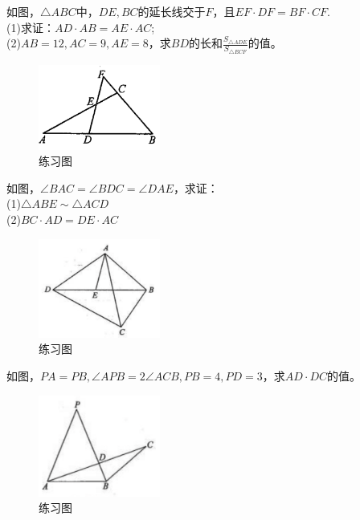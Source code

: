 \documentclass{ecnuthesis}
\begin{document}
\begin{problem}
    如图，$\triangle ABC$中，$DE,BC$的延长线交于$F$，且$EF·DF=BF·CF$. \\
    (1)求证：$AD·AB=AE·AC$; \\
    (2)$AB=12,AC=9,AE=8$，求$BD$的长和$\frac{S_{\triangle ADE}}{S_{\triangle ECF}}$的值。\\
\end{problem}
\begin{figure}[H]
\centering
\includegraphics[width=4cm]{picture/836.png}
\caption{练习图}
\end{figure}
\begin{problem}
    如图，$\angle BAC=\angle BDC=\angle DAE$，求证：\\
    (1)$\triangle ABE \sim \triangle ACD$ \\
    (2)$BC·AD=DE·AC$ \\
\end{problem}
\begin{figure}[H]
\centering
\includegraphics[width=4cm]{picture/838.png}
\caption{练习图}
\end{figure}
\begin{problem}
    如图，$PA=PB,\angle APB=2\angle ACB,PB=4,PD=3$，求$AD·DC$的值。
\end{problem}
\begin{figure}[H]
\centering
\includegraphics[width=4cm]{picture/857.png}
\caption{练习图}
\end{figure}
\clearpage
\end{document}
